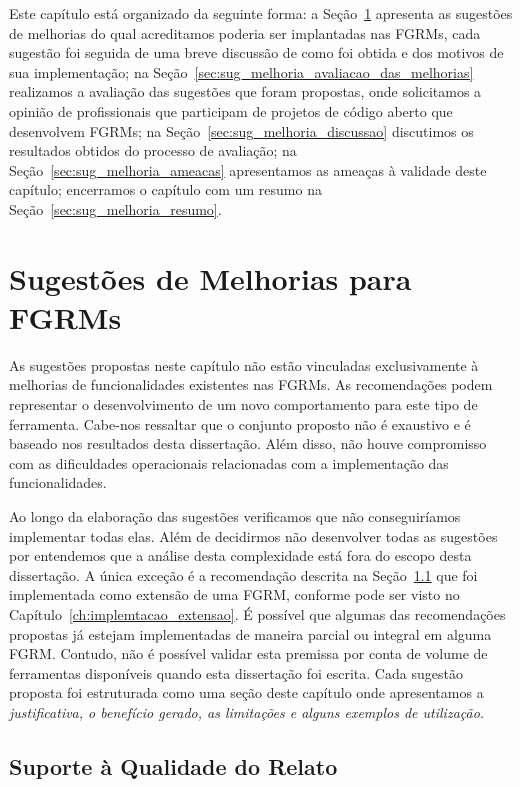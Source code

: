 Este capítulo está organizado da seguinte forma: a
Seção~\ref{sec:sug_melhoria_melhorando_as_ferraementas} apresenta as sugestões
de melhorias do qual acreditamos poderia ser implantadas nas FGRMs, cada
sugestão foi seguida de uma breve discussão de como foi obtida e dos motivos de
sua implementação; na Seção~\ref{sec:sug_melhoria_avaliacao_das_melhorias}
realizamos a avaliação das sugestões que foram propostas, onde solicitamos a
opinião de profissionais que participam de projetos de código aberto que
desenvolvem FGRMs; na Seção~\ref{sec:sug_melhoria_discussao} discutimos os
resultados obtidos do processo de avaliação; na
Seção~\ref{sec:sug_melhoria_ameacas} apresentamos as ameaças à validade deste
capítulo; encerramos o capítulo com um resumo na
Seção~\ref{sec:sug_melhoria_resumo}.

\section{Sugestões de Melhorias para FGRMs}
\label{sec:sug_melhoria_melhorando_as_ferraementas}

As sugestões propostas neste capítulo não estão vinculadas exclusivamente à
melhorias de funcionalidades existentes nas FGRMs. As recomendações podem
representar o desenvolvimento de um novo comportamento para este tipo de
ferramenta. Cabe-nos ressaltar que o conjunto proposto não é exaustivo e é
baseado nos resultados desta dissertação. Além disso, não houve compromisso com
as dificuldades operacionais relacionadas com a implementação das
funcionalidades.

Ao longo da elaboração das sugestões verificamos que não conseguiríamos
implementar todas elas. Além de decidirmos não desenvolver todas as sugestões
por entendemos que a análise desta complexidade está fora do escopo desta
dissertação. A única exceção é a recomendação descrita na
Seção~\ref{sub:supote_a_qualidade_do_relato} que foi implementada como extensão
de uma FGRM, conforme pode ser visto no Capítulo~\ref{ch:implemtacao_extensao}.
É possível que algumas das recomendações propostas já estejam implementadas de
maneira parcial ou integral em alguma FGRM\@. Contudo, não é possível validar
esta premissa por conta de volume de ferramentas disponíveis quando esta
dissertação foi escrita. Cada sugestão proposta foi estruturada como uma seção
deste capítulo onde apresentamos a \textit{justificativa, o benefício gerado, as
    limitações e alguns exemplos de utilização.}

\subsection{Suporte à Qualidade do Relato}
\label{sub:supote_a_qualidade_do_relato}

